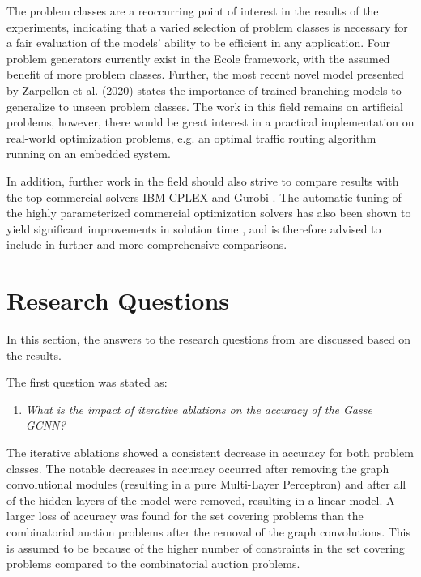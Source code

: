 The problem classes are a reoccurring point of interest in the results of the experiments, indicating that a varied selection of problem classes is necessary for a fair evaluation of the models' ability to be efficient in any application. Four problem generators currently exist in the \gls{Ecole} framework, with the assumed benefit of more problem classes. Further, the most recent novel model presented by Zarpellon et al. (2020) \cite{zarpellon2020parameterizing} states the importance of trained branching models to generalize to unseen problem classes.
The work in this field remains on artificial problems, however, there would be great interest in a practical implementation on real-world optimization problems, e.g. an optimal traffic routing algorithm running on an embedded system. 

In addition, further work in the field should also strive to compare results with the top commercial solvers IBM CPLEX and Gurobi \cite{anand2017comparative}. The automatic tuning of the highly parameterized commercial optimization solvers has also been shown to yield significant improvements in solution time \cite{hutter2010automated}, and is therefore advised to include in further and more comprehensive comparisons.   





\section{Research Questions}\label{sec:dis_questions}

In this section, the answers to the research questions from  are discussed based on the results. 

The first question was stated as:
%
\begin{enumerate}[label=(\roman*)]
    \item \textit{What is the impact of iterative ablations on the accuracy of the Gasse \gls{GCNN}?}
\end{enumerate}
%
The iterative ablations showed a consistent decrease in accuracy for both problem classes. The notable decreases in accuracy occurred after removing the graph convolutional modules (resulting in a pure Multi-Layer Perceptron) and after all of the hidden layers of the model were removed, resulting in a linear model. A larger loss of accuracy was found for the set covering problems than the combinatorial auction problems after the removal of the graph convolutions.
This is assumed to be because of the higher number of constraints in the set covering problems compared to the combinatorial auction problems. 

